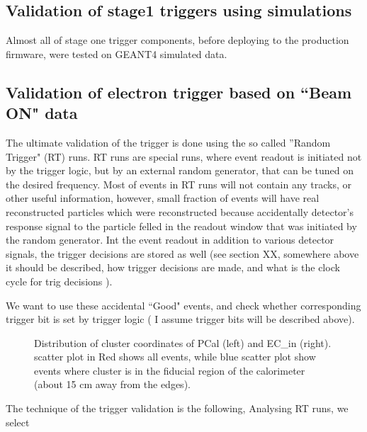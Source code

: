 
\subsection{Validation of stage1 triggers using simulations}
Almost all of stage one trigger components, before deploying to the production firmware, were tested on GEANT4 simulated data.

\subsection{Validation of electron trigger based on ``Beam ON" data}
\label{sec:validation_random}
The ultimate validation of the trigger is done using the so called ''Random Trigger" (RT) runs.
RT runs are special runs, where event readout is initiated not by the trigger logic, but by an external random generator, that
can be tuned on the desired frequency. Most of events in RT runs will not contain any tracks, or other useful information, however,
small fraction of events will have real reconstructed particles which were reconstructed because accidentally detector's response
signal to the particle felled in the readout window that was initiated by the random generator.
Int the event readout in addition to various detector signals, the trigger decisions are stored as well (see section {\color{Red} XX, somewhere above
it should be described, how trigger decisions are made, and what is the clock cycle for trig decisions }).

We want to use these accidental ``Good" events, and check whether corresponding trigger bit is set by trigger logic ({\color{Red} I assume
trigger bits will be described above}).
\begin{figure}[!htb]
 \centering
 \caption{Distribution of cluster coordinates of PCal (left) and EC\_{in} (right).
 scatter plot in Red shows all events, while blue scatter plot show events where cluster
 is in the fiducial region of the calorimeter (about 15 cm away from the edges).}
\end{figure}

The technique of the trigger validation is the following,
Analysing RT runs, we select 
